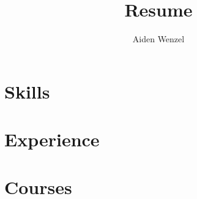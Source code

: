 \documentclass{article}
\title{Resume}
\author{Aiden Wenzel}
\begin{document}
		
\maketitle

\section{Skills}

\section{Experience}

\section{Courses}
\end{document}
